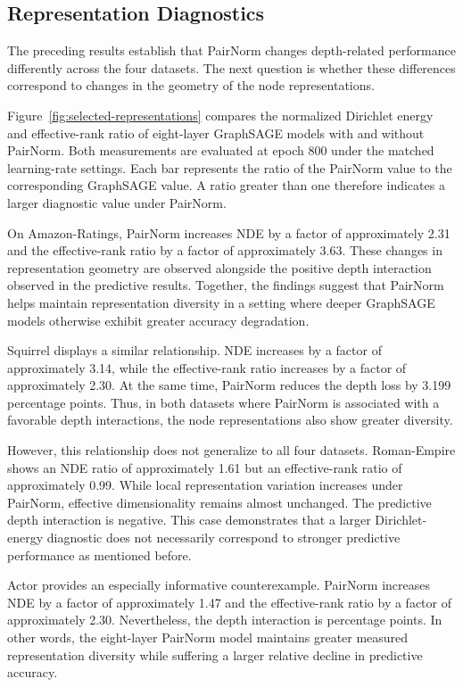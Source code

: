 \documentclass[english]{lni}
\begin{document}
\subsection{Representation Diagnostics}
\label{sec:selected-representations}

The preceding results establish that PairNorm changes depth-related performance differently across the four datasets. The next question is whether these differences correspond to changes in the geometry of the node representations.

Figure~\ref{fig:selected-representations} compares the normalized Dirichlet energy and effective-rank ratio of eight-layer GraphSAGE models with and without PairNorm. Both measurements are evaluated at epoch 800 under the matched learning-rate settings. Each bar represents the ratio of the PairNorm value to the corresponding GraphSAGE value. A ratio greater than one therefore indicates a larger diagnostic value under PairNorm.

On Amazon-Ratings, PairNorm increases NDE by a factor of approximately 2.31 and the effective-rank ratio by a factor of approximately 3.63. These changes in representation geometry are observed alongside the positive depth interaction observed in the predictive results. Together, the findings suggest that PairNorm helps maintain representation diversity in a setting where deeper GraphSAGE models otherwise exhibit greater accuracy degradation.

Squirrel displays a similar relationship. NDE increases by a factor of approximately 3.14, while the effective-rank ratio increases by a factor of approximately 2.30. At the same time, PairNorm reduces the depth loss by 3.199 percentage points. Thus, in both datasets where PairNorm is associated with a favorable depth interactions, the node representations also show greater diversity.

However, this relationship does not generalize to all four datasets. Roman-Empire shows an NDE ratio of approximately 1.61 but an effective-rank ratio of approximately 0.99. While local representation variation increases under PairNorm, effective dimensionality remains almost unchanged. The predictive depth interaction is negative. This case demonstrates that a larger Dirichlet-energy diagnostic does not necessarily correspond to stronger predictive performance as mentioned before. 

Actor provides an especially informative counterexample. PairNorm increases NDE by a factor of approximately 1.47 and the effective-rank ratio by a factor of approximately 2.30. Nevertheless, the depth interaction is \mbox{} percentage points. In other words, the eight-layer PairNorm model maintains greater measured representation diversity while suffering a larger relative decline in predictive accuracy.
\end{document}
